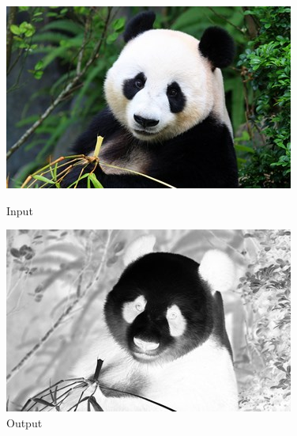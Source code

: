 \documentclass[a4paper,8pt]{article}
\begin{document}
        \begin{figure}[H]
        \centering
        \begin{minipage}{0.4\linewidth}
        \centering
        \includegraphics[width=\linewidth]{output/input1.jpg}
        \caption{Input}
        \end{minipage}
        \hfill
        \begin{minipage}{0.4\linewidth}
        \centering
        \includegraphics[width=\linewidth]{output/Negative Transformation_output.png}
        \caption{Output}
        \end{minipage}
        \end{figure}
        \clearpage
        
\end{document}
